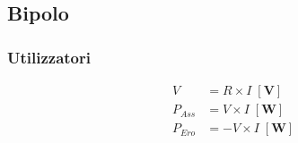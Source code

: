 \documentclass[10pt]{article}
\newcommand{\unit}[1]{\left[\mathbf{#1}\right]}
\begin{document}
    \subsection*{Bipolo}

        \begin{minipage}[t]{.3\textwidth}
            \vspace{-\baselineskip}

            \subsubsection*{Utilizzatori}

                \begin{minipage}[t]{.2\textwidth}
                    \vspace{-\baselineskip}

                    
                \end{minipage}
                \hfill
                \begin{minipage}[t]{.8\textwidth}
                    \vspace{-1.5\baselineskip}

                    \begin{align*}
                        V &= R \times I \; \unit{V}\\
                        P_{Ass} &= V \times I \; \unit{W}\\
                        P_{Ero} &= - V \times I \; \unit{W}
                    \end{align*}
                \end{minipage}

        \end{minipage}
        \hfill
\end{document}
